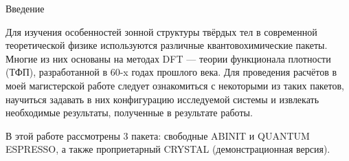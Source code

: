 \begin{center}
    Введение
\end{center}

Для изучения особенностей зонной структуры твёрдых тел в современной теоретической физике используются различные квантовохимические пакеты. Многие из них основаны на методах DFT --- теории функционала плотности (ТФП), разработанной в 60-x годах прошлого века. Для проведения расчётов в моей магистерской работе следует ознакомиться с некоторыми из таких пакетов, научиться задавать в них конфигурацию исследуемой системы и извлекать необходимые результаты, полученные в результате работы. 

В этой работе рассмотрены 3 пакета: свободные ABINIT и QUANTUM ESPRESSO, а также проприетарный CRYSTAL (демонстрационная версия).
